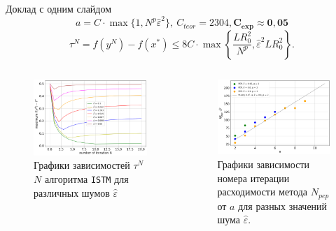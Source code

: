 \documentclass{beamer}
\begin{document}
\begin{frame}{Доклад с одним слайдом}
\begin{equation}\label{formula_for_a}
    a = C \cdot \max{\{1, N^p \hat{\varepsilon}^2\}},\ C_{teor} = 2304, \mathbf{C_{exp} \approx 0,05}
\end{equation}
\begin{equation}\label{eq:conv_rate_alg1_proper_a}
\tau^N = f(y^N) - f(x^*) \leq 8C \cdot \max \left\{ \frac{LR_0^2}{N^p}, \hat{\varepsilon}^2 L R_0^2 \right\}.
\end{equation}

\begin{columns}[c]
\begin{figure}
\includegraphics[width=1.0\textwidth]{convergence_rate.png}
    \caption{Графики зависимостей $\tau^N$  $N$ алгоритма \texttt{ISTM} для различных шумов $\hat{\varepsilon}$}
\end{figure}
\begin{figure}
\includegraphics[width=1.0\textwidth]{find_c.png}
    \caption{Графики зависимости номера итерации расходимости метода $N_{pep}$ от $a$ для разных значений шума $\hat{\varepsilon}$. }
    \end{figure}
\end{columns}

\end{frame}
\end{document}
